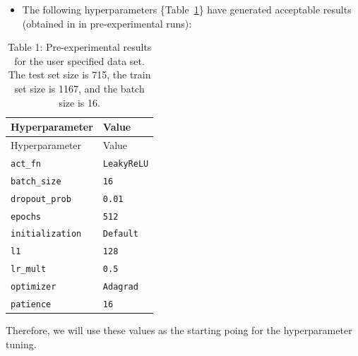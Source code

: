 \documentclass[
  letterpaper,
  DIV=11,
  numbers=noendperiod]{scrreprt}
\providecommand{\tightlist}{%
  \setlength{\itemsep}{0pt}\setlength{\parskip}{0pt}}\usepackage{longtable,booktabs,array}
\begin{document}
\begin{tcolorbox}[enhanced jigsaw, coltitle=black, bottomrule=.15mm, breakable, toprule=.15mm, colframe=quarto-callout-note-color-frame, title=\textcolor{quarto-callout-note-color}{\faInfo}\hspace{0.5em}{Note: Pre-experimental Results}, colbacktitle=quarto-callout-note-color!10!white, opacityback=0, left=2mm, leftrule=.75mm, colback=white, rightrule=.15mm, bottomtitle=1mm, toptitle=1mm, titlerule=0mm, arc=.35mm, opacitybacktitle=0.6]

\begin{itemize}
\tightlist
\item
  The following hyperparameters
  \{Table~\ref{tbl-pre-experimental-results-33}\} have generated
  acceptable results (obtained in in pre-experimental runs):
\end{itemize}

\begin{longtable}[]{@{}ll@{}}
\caption{Table 1: Pre-experimental results for the user specified data
set. The test set size is 715, the train set size is 1167, and the batch
size is 16.}\label{tbl-pre-experimental-results-33}\tabularnewline
\toprule\noalign{}
Hyperparameter & Value \\
\midrule\noalign{}
\endfirsthead
\toprule\noalign{}
Hyperparameter & Value \\
\midrule\noalign{}
\endhead
\bottomrule\noalign{}
\endlastfoot
\texttt{act\_fn} & \texttt{LeakyReLU} \\
\texttt{batch\_size} & \texttt{16} \\
\texttt{dropout\_prob} & \texttt{0.01} \\
\texttt{epochs} & \texttt{512} \\
\texttt{initialization} & \texttt{Default} \\
\texttt{l1} & \texttt{128} \\
\texttt{lr\_mult} & \texttt{0.5} \\
\texttt{optimizer} & \texttt{Adagrad} \\
\texttt{patience} & \texttt{16} \\
\end{longtable}

Therefore, we will use these values as the starting poing for the
hyperparameter tuning.

\end{tcolorbox}
\end{document}
